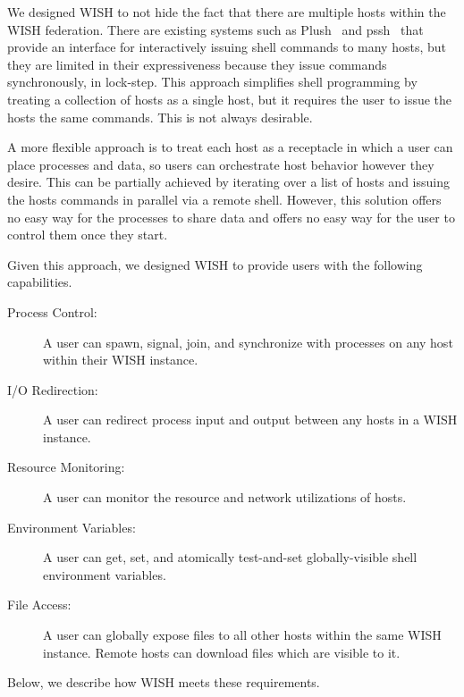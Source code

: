  \label{sec:design}

We designed WISH to not hide the fact that there are multiple hosts within the
WISH federation.  There are existing systems such as Plush~\cite{plush} and
pssh~\cite{parallel-ssh} that provide an interface for interactively issuing
shell commands to many hosts, but they are limited in their expressiveness
because they issue commands synchronously, in lock-step.  This approach
simplifies shell programming by treating a collection of hosts as a single
host, but it requires the user to issue the hosts the same commands.  This is
not always desirable.

A more flexible approach is to treat each host as a receptacle in which a user
can place processes and data, so users can orchestrate host behavior however
they desire.  This can be partially achieved by iterating over a list of hosts
and issuing the hosts commands in parallel via a remote shell.  However, this
solution offers no easy way for the processes to share data and offers no easy
way for the user to control them once they start.

Given this approach, we designed WISH to provide users with the following
capabilities.

\begin{description}

\item[Process Control:] A user can spawn, signal, join, and synchronize with
processes on any host within their WISH instance.

\item[I/O Redirection:] A user can redirect process input and output between
any hosts in a WISH instance.

\item[Resource Monitoring:] A user can monitor the resource and network
utilizations of hosts.

\item[Environment Variables:] A user can get, set, and atomically test-and-set
globally-visible shell environment variables.

\item[File Access:] A user can globally expose files to all other hosts within
the same WISH instance. Remote hosts can download files which are visible to
it.

\end{description}

Below, we describe how WISH meets these requirements.


